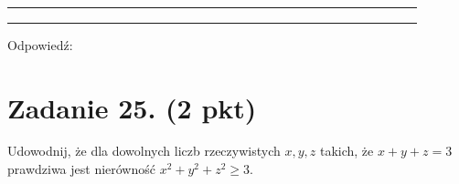 \documentclass[10pt]{article}
\begin{document}
\begin{center}
\begin{tabular}{|c|c|c|c|c|c|c|c|c|c|c|c|c|c|c|c|c|c|c|c|c|c|c|c|c|c|c|c|c|c|c|c|}
 &  &  &  &  &  &  &  &  &  &  &  &  &  &  &  &  &  &  &  &  &  &  &  &  &  &  &  &  &  &  \\
\hline
 &  &  &  &  &  &  &  &  &  &  &  &  &  &  &  &  &  &  &  &  &  &  &  &  &  &  &  &  &  &  &  \\
\hline
 &  &  &  &  &  &  &  &  &  &  &  &  &  &  &  &  &  &  &  &  &  &  &  &  &  &  &  &  &  &  &  \\
\hline
 &  &  &  &  &  &  &  &  &  &  &  &  &  &  &  &  &  &  &  &  &  &  &  &  &  &  &  &  &  &  &  \\
\hline
\end{tabular}
\end{center}

Odpowiedź: \(\qquad\)

\section*{Zadanie 25. (2 pkt)}
Udowodnij, że dla dowolnych liczb rzeczywistych \(x, y, z\) takich, że \(x+y+z=3\) prawdziwa jest nierówność \(x^{2}+y^{2}+z^{2} \geq 3\).
\end{document}
